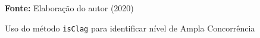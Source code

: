 \begin{figure}[ht!]
\centering

\caption{\textmd{Uso do método \texttt{isClag} para identificar nível de Ampla Concorrência}}
\label{fig:behaviorcatuso}

\par\medskip\textbf{Fonte:} Elaboração do autor (2020) \par\medskip

\end{figure}

